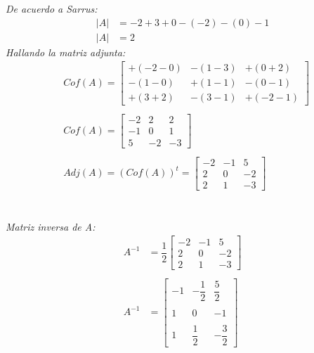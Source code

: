 \documentclass[11pt, a4paper]{article}
\begin{document}
\begin{multicols*}{2}
  \textit{De acuerdo a Sarrus:}
  \begin{align*}
    |A| &= -2+3+0-\left(-2\right)-(0)-1\\
    |A| &= 2
  \end{align*}
  \textit{Hallando la matriz adjunta:}
  \begin{align*}
    &Cof\left(A\right) = \begin{bmatrix}
      +\left(-2-0\right) & -\left(1-3\right) & +\left(0+2\right)\\
      -\left(1-0\right) & +\left(1-1\right) & -\left(0-1\right)\\
      +\left(3+2\right) & -\left(3-1\right) & +\left(-2-1\right)
    \end{bmatrix}\\\\
    &Cof\left(A\right) = \begin{bmatrix}
      -2 & 2 & 2\\
      -1 & 0 & 1\\
      5 & -2 & -3
    \end{bmatrix}\\\\
    &Adj\left(A\right) = \left(Cof\left(A\right)\right)^t = \begin{bmatrix}
      -2 & -1 & 5\\
      2 & 0 & -2\\
      2 & 1 & -3
    \end{bmatrix}
  \end{align*}\\
  \columnbreak\\
  \columnseprule=1pt 
  \textit{Matriz inversa de A:}
  \begin{align*}
    A^{-1} &= \dfrac{1}{2}\begin{bmatrix}
      -2 & -1 & 5\\
      2 & 0 & -2\\
      2 & 1 & -3
    \end{bmatrix}\\\\
    A^{-1} &= \begin{bmatrix}
      -1 & -\dfrac{1}{2} & \dfrac{5}{2}\\\\
      1 & 0 & -1\\\\
      1 & \dfrac{1}{2} & -\dfrac{3}{2}
    \end{bmatrix}
  \end{align*}\\

\end{multicols*}
\end{document}
